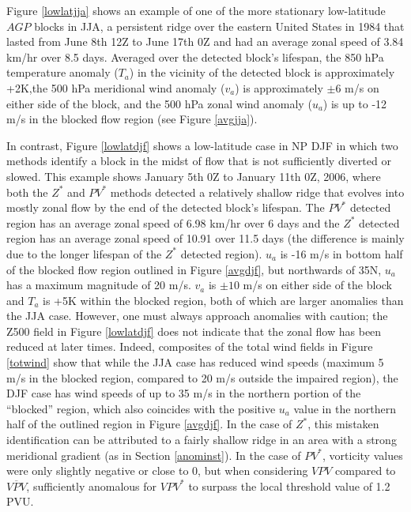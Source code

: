 \documentclass[smallextended]{svjour3}       %
\numberwithin{equation}{section}
\begin{document}
Figure \ref{lowlatjja} shows an example of one of the more stationary low-latitude $AGP$ blocks in JJA, a persistent ridge over the eastern United States in 1984 that lasted from June 8th 12Z to June 17th 0Z and had an average zonal speed of 3.84 km/hr over 8.5 days. Averaged over the detected block's lifespan, the 850 hPa temperature anomaly ($T_a$) in the vicinity of the detected block is approximately +2K,the 500 hPa meridional wind anomaly ($v_a$) is approximately $\pm6$ m/s on either side of the block, and the 500 hPa zonal wind anomaly ($u_a$) is up to -12 m/s in the blocked flow region (see Figure \ref{avgjja}). 

In contrast, Figure \ref{lowlatdjf} shows a low-latitude case in NP DJF in which two methods identify a block in the midst of flow that is not sufficiently diverted or slowed. This example shows January 5th 0Z to January 11th 0Z, 2006, where both the $Z^*$ and $PV^*$ methods detected a relatively shallow ridge that evolves into mostly zonal flow by the end of the detected block's lifespan. The $PV^*$ detected region has an average zonal speed of 6.98 km/hr over 6 days and the $Z^*$ detected region has an average zonal speed of 10.91 over 11.5 days (the difference is mainly due to the longer lifespan of the $Z^*$ detected region). $u_a$ is -16 m/s in bottom half of the blocked flow region outlined in Figure \ref{avgdjf}, but northwards of 35N, $u_a$ has a maximum magnitude of 20 m/s. $v_a$ is $\pm 10$ m/s on either side of the block and $T_a$ is +5K within the blocked region, both of which are larger anomalies than the JJA case. However, one must always approach anomalies with caution; the Z500 field in Figure \ref{lowlatdjf} does not indicate that the zonal flow has been reduced at later times. Indeed, composites of the total wind fields in Figure \ref{totwind} show that while the JJA case has reduced wind speeds (maximum 5 m/s in the blocked region, compared to 20 m/s outside the impaired region), the DJF case has wind speeds of up to 35 m/s in the northern portion of the ``blocked'' region, which also coincides with the positive $u_a$ value in the northern half of the outlined region in Figure \ref{avgdjf}. In the case of $Z^*$, this mistaken identification can be attributed to a fairly shallow ridge in an area with a strong meridional gradient (as in Section \ref{anominst}). In the case of $PV^*$, vorticity values were only slightly negative or close to 0, but when considering $VPV$ compared to $\overline{VPV}$, sufficiently anomalous for $VPV^*$ to surpass the local threshold value of 1.2 PVU.
\end{document}
